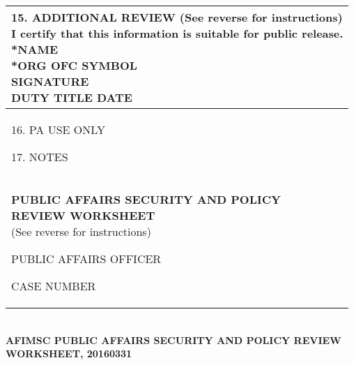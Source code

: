 \documentclass{article}
\begin{document}
{\begin{tabular}{|l|}
\parbox[][\rhXI][c]{.5\textwidth}{
\vspace{2pt}
\small 15. ADDITIONAL REVIEW (See reverse for instructions)\\[2pt]
\scriptsize I certify that this information is suitable for public release.\\[12pt]
*NAME \\[4pt]
*ORG \hspace{2.25pt}  \hspace{1.43pt} OFC SYMBOL \\[4pt]
SIGNATURE \\[4pt]
DUTY TITLE  \hspace{1.475pt} DATE 

}\\
\hline
\parbox[][\rhXII][t]{.15\textwidth}{
\vspace{4pt}
\small 16. PA USE ONLY\\[4pt]
}\vrule\hspace{1pt}

\parbox[][\rhXII][t]{.85\textwidth}{
\vspace{4pt}
\small 17. NOTES\\[4pt] 
}\\
\hline
\parbox[][\rhXIII][c]{0.59\textwidth}{
\centering
\textbf{PUBLIC AFFAIRS SECURITY AND POLICY}\\[1pt]
\textbf{REVIEW WORKSHEET}\\[1pt]
(See reverse for instructions)
} \vrule \hspace{1pt}

\parbox[][\rhXIII][t]{0.27\textwidth}{
\vspace{4pt}
\small PUBLIC AFFAIRS OFFICER\\[4pt]
}\vrule \hspace{1pt}

\parbox[][\rhXIII][t]{0.13\textwidth}{
\vspace{4pt}
\small CASE NUMBER\\[4pt]
}\\
\hline

\end{tabular}
}\\[2pt]
\textbf{AFIMSC PUBLIC AFFAIRS SECURITY AND POLICY REVIEW WORKSHEET, 20160331}
\end{document}
